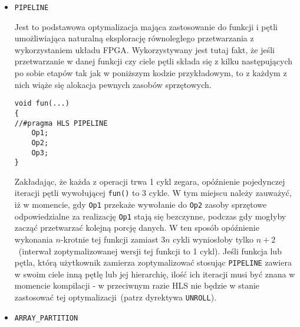 \begin{itemize}
\item \texttt{PIPELINE}

Jest to podstawowa optymalizacja mająca zastosowanie do funkcji i pętli umożliwiająca naturalną eksplorację równoległego przetwarzania z wykorzystaniem układu FPGA.  Wykorzystywany jest tutaj fakt, że jeśli przetwarzanie w danej funkcji czy ciele pętli składa się z kilku następujących po sobie etapów tak jak w poniższym kodzie przykładowym, to z każdym z nich wiąże się alokacja pewnych zasobów sprzętowych.
\begin{lstlisting}[caption=Kod ilustrujący zastosowania dyrektywy PIPELINE]
void fun(...)
{
//#pragma HLS PIPELINE
	Op1;
	Op2;
	Op3;
}
\end{lstlisting}
Zakładając, że każda z operacji trwa 1 cykl zegara, opóźnienie pojedynczej iteracji pętli wywołującej \texttt{fun()} to 3 cykle. W tym miejscu należy zauważyć, iż w momencie, gdy \texttt{Op1} przekaże wywołanie do \texttt{Op2} zasoby sprzętowe odpowiedzialne za realizację \texttt{Op1} stają się bezczynne, podczas gdy mogłyby zacząć przetwarzać kolejną porcję danych. W ten sposób opóźnienie wykonania $n$-krotnie tej funkcji zamiast $3n$ cykli wyniosłoby tylko $n + 2$~(interwał zoptymalizowanej wersji tej funkcji to 1 cykl).
Jeśli funkcja lub pętla, którą użytkownik zamierza zoptymalizować stosując \texttt{PIPELINE} zawiera w swoim ciele inną pętlę lub jej hierarchię, ilość ich iteracji musi być znana w momencie kompilacji - w przeciwnym razie HLS nie będzie w stanie zastosować tej optymalizacji~(patrz dyrektywa \texttt{UNROLL}).

\item \texttt{ARRAY\_PARTITION}


\end{itemize}
